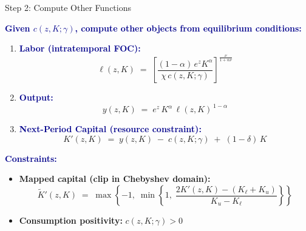 \documentclass[9pt,xcolor={usenames, dvipsnames}]{beamer}
\theoremstyle{definition}
\begin{document}
\begin{frame}{Step 2: Compute Other Functions}
    \small
    
    \textbf{\textcolor{darkblue}{Given $c(z,K;\gamma)$, compute other objects from equilibrium conditions:}}
    
    \begin{enumerate}
      \item \textbf{\textcolor{darkblue}{Labor (intratemporal FOC):}}
      \[
      \ell(z,K) \;=\; \left[\frac{(1-\alpha)\,e^{z} K^{\alpha}}{\chi\, c(z,K;\gamma)}\right]^{\frac{\nu}{1+\alpha\nu}}
      \]
    
      \item \textbf{\textcolor{darkblue}{Output:}}
      \[
      y(z,K) \;=\; e^{z}\, K^{\alpha}\, \ell(z,K)^{\,1-\alpha}
      \]
    
      \item \textbf{\textcolor{darkblue}{Next-Period Capital (resource constraint):}}
      \[
      K'(z,K) \;=\; y(z,K) \;-\; c(z,K;\gamma) \;+\; (1-\delta)\,K
      \]
    \end{enumerate}
    
    \vspace{0.6em}
    \textbf{\textcolor{darkblue}{Constraints:}}
    \begin{itemize}
      \item \textbf{Mapped capital (clip in Chebyshev domain):}
      \[
      \tilde K'(z,K) \;=\; \max\!\left\{-1,\; \min\!\left\{1,\;
      \frac{2K'(z,K) - (K_\ell + K_u)}{K_u - K_\ell}
      \right\}\right\}
      \]
      \item \textbf{Consumption positivity:} \quad \(c(z,K;\gamma) > 0\)
    \end{itemize}
    
    \end{frame}
    
\end{document}
